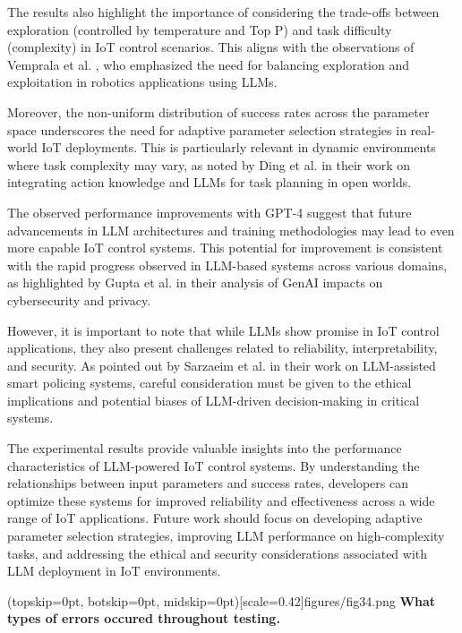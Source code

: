 \documentclass{ieeeaccess}
\begin{document}
The results also highlight the importance of considering the trade-offs between exploration (controlled by temperature and Top P) and task difficulty (complexity) in IoT control scenarios. This aligns with the observations of Vemprala et al. \cite{10500490}, who emphasized the need for balancing exploration and exploitation in robotics applications using LLMs.

Moreover, the non-uniform distribution of success rates across the parameter space underscores the need for adaptive parameter selection strategies in real-world IoT deployments. This is particularly relevant in dynamic environments where task complexity may vary, as noted by Ding et al. \cite{Ding2023} in their work on integrating action knowledge and LLMs for task planning in open worlds.

The observed performance improvements with GPT-4 suggest that future advancements in LLM architectures and training methodologies may lead to even more capable IoT control systems. This potential for improvement is consistent with the rapid progress observed in LLM-based systems across various domains, as highlighted by Gupta et al. \cite{10198233} in their analysis of GenAI impacts on cybersecurity and privacy.

However, it is important to note that while LLMs show promise in IoT control applications, they also present challenges related to reliability, interpretability, and security. As pointed out by Sarzaeim et al. \cite{10538107} in their work on LLM-assisted smart policing systems, careful consideration must be given to the ethical implications and potential biases of LLM-driven decision-making in critical systems.

The experimental results provide valuable insights into the performance characteristics of LLM-powered IoT control systems. By understanding the relationships between input parameters and success rates, developers can optimize these systems for improved reliability and effectiveness across a wide range of IoT applications. Future work should focus on developing adaptive parameter selection strategies, improving LLM performance on high-complexity tasks, and addressing the ethical and security considerations associated with LLM deployment in IoT environments.



\Figure[t!](topskip=0pt, botskip=0pt,
midskip=0pt)[scale=0.42]{{figures/fig34.png}}
{ \textbf{What types of errors occured throughout testing.}\label{fig14}}
\end{document}
